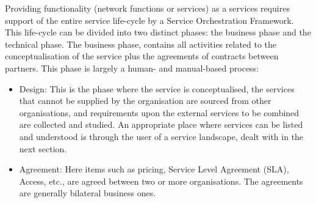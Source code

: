         Providing functionality (network functions or services) as a services requires support of the entire service life-cycle by a Service Orchestration Framework. This life-cycle can be divided into two distinct phases: the business phase and the technical phase. The business phase, contains all activities related to the conceptualisation of the service plus the agreements of contracts between partners. This phase is largely a human- and manual-based process:
        \begin{itemize}
            \item Design: This is the phase where the service is conceptualised, the services that cannot be supplied by the organisation are sourced from other organisations, and requirements upon the external services to be combined are collected and studied. An appropriate place where services can be listed and understood is through the user of a service landscape, dealt with in the next section.
            \item Agreement: Here items such as pricing, Service Level Agreement (SLA), Access, etc., are agreed between two or more organisations. The agreements are generally bilateral business ones. 
        \end{itemize}
        
